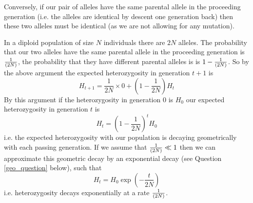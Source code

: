 Conversely, if our pair of alleles have the same parental allele in
the proceeding generation (i.e. the alleles are identical by descent
one generation back) then these two alleles must be identical (as we
are not allowing for any mutation). \\


In a diploid population of size $N$ individuals there are $2N$ alleles. The
probability that our two alleles have the same parental allele in the
proceeding generation is $\nicefrac{1}{(2N)}$, the probability that they have
different parental alleles is is $1-\nicefrac{1}{(2N)}$. So by the above
argument the expected heterozygosity in generation $t+1$ is
%
\begin{equation}
H_{t+1} = \frac{1}{2N} \times 0 + \left(1-\frac{1}{2N} \right)H_t
\end{equation}
%
By this argument if the heterozygosity in generation $0$ is $H_0$ our
expected heterozygosity in generation $t$ is
%
\begin{equation}
H_t = \left(1-\frac{1}{2N} \right)^tH_0
\end{equation}
%
i.e. the expected heterozygosity with our population is decaying
geometrically with each passing generation. If we assume that $\nicefrac{1}{(2N)}
\ll 1$ then we can approximate this geometric decay by an exponential
decay (see Question \ref{geo_question} below), such that
%
\begin{equation}
H_t =H_0 \exp \left(-\frac{t}{2N} \right)  
\end{equation}
%
i.e. heterozygosity decays exponentially at a rate
$\nicefrac{1}{(2N)}$.

